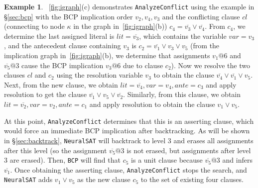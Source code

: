 \documentclass[oneside,11pt,dvipsnames]{book}
\numberwithin{equation}{section}
\theoremstyle{definition}
\newtheorem{example}{Example}[section]
\theoremstyle{remark}
\newcommand{\tool}{\texttt{NeuralSAT}}
\begin{document}
\begin{example}

   ~\autoref{fig:igraph}(c) demonstrates \texttt{AnalyzeConflict} using the example in \S\ref{sec:bcp} with the BCP implication order $v_2,v_4,v_3$ and the conflicting clause $cl$ (connecting to node $\kappa$ in the graph in~\autoref{fig:igraph}(b)) $c_4=\overline{v_3} \lor \overline{v_4}$. From $c_4$, we determine the last assigned literal is $lit=\overline{v_3}$, which contains the variable $var=v_3$, and the antecedent clause containing $v_3$ is $c_2=\overline{v_1} \lor v_3 \lor v_5$ (from the implication graph in~\autoref{fig:igraph}(b), we determine that assignments $v_1@6$ and $\overline{v_5}@3$ cause the BCP implication $v_3@6$ due to clause $c_2$). Now we resolve the two clauses $cl$ and $c_2$ using the resolution variable $v_3$ to obtain the clause $\overline{v_4} \lor \overline{v_1} \lor v_5$.
Next, from the new clause, we obtain $lit=\overline{v_4}, var=v_4, ante=c_3$ and apply resolution to get the clause $\overline{v_1} \vee v_5 \lor \overline{v_2}$.
Similarly, from this clause, we obtain $lit=\overline{v_2}, var=v_2, ante=c_1$ and apply resolution to obtain the clause $v_1 \lor v_5$.


At this point, \texttt{AnalyzeConflict} determines that this is an asserting clause, which would force an immediate BCP implication after backtracking. As will be shown in \S\ref{sec:backtrack}, \tool{} will backtrack to level 3 and erases all assignments after this level (so the assignment $\overline{v_5}@3$ is not erased, but assignments after level 3 are erased).  Then, \texttt{BCP} will find that $c_5$ is a unit clause because $\overline{v_5}@3$ and infers $\overline{v_1}$.
Once obtaining the asserting clause, \texttt{AnalyzeConflict} stops the search, and \tool{} adds  $v_1\lor v_5$ as the new clause $c_5$ to the set of existing four clauses.

\end{example}
\end{document}
